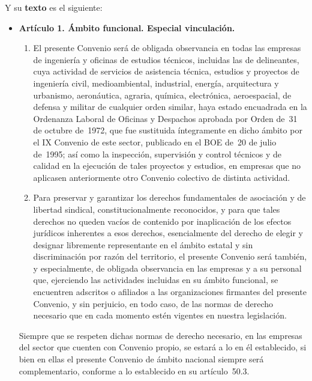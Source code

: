 \begin{enumerate}
\begin{enumerate}
        Y su \textbf{texto} es el siguiente:

        \begin{itemize}
            \item \textbf{Artículo 1. Ámbito funcional. Especial vinculación.}

            \begin{enumerate}
                \item El presente Convenio será de obligada observancia en todas las empresas de ingeniería y oficinas de estudios técnicos, incluidas las de delineantes, cuya actividad de servicios de asistencia técnica, estudios y proyectos de ingeniería civil, medioambiental, industrial, energía, arquitectura y urbanismo, aeronáutica, agraria, química, electrónica, aeroespacial, de defensa y militar de cualquier orden similar, haya estado encuadrada en la Ordenanza Laboral de Oficinas y Despachos aprobada por Orden de 31 de octubre de 1972, que fue sustituida íntegramente en dicho ámbito por el IX Convenio de este sector, publicado en el BOE de 20 de julio de 1995; así como la inspección, supervisión y control técnicos y de calidad en la ejecución de tales proyectos y estudios, en empresas que no aplicasen anteriormente otro Convenio colectivo de distinta actividad.

                \item Para preservar y garantizar los derechos fundamentales de asociación y de libertad sindical, constitucionalmente reconocidos, y para que tales derechos no queden vacíos de contenido por inaplicación de los efectos jurídicos inherentes a esos derechos, esencialmente del derecho de elegir y designar libremente representante en el ámbito estatal y sin discriminación por razón del territorio, el presente Convenio será también, y especialmente, de obligada observancia en las empresas y a su personal que, ejerciendo las actividades incluidas en su ámbito funcional, se encuentren adscritos o afiliados a las organizaciones firmantes del presente Convenio, y sin perjuicio, en todo caso, de las normas de derecho necesario que en cada momento estén vigentes en nuestra legislación.
            \end{enumerate}

            Siempre que se respeten dichas normas de derecho necesario, en las empresas del sector que cuenten con Convenio propio, se estará a lo en él establecido, si bien en ellas el presente Convenio de ámbito nacional siempre será complementario, conforme a lo establecido en su artículo 50.3.


\end{itemize}
\end{enumerate}
\end{enumerate}
